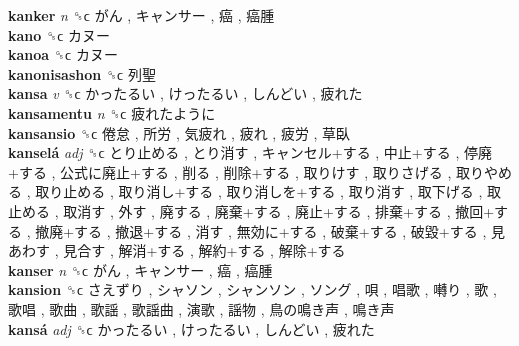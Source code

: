 \textbf{kanker} \emph{n}  ␝ϲ   がん ,  キャンサー ,  癌 ,  癌腫   \\
\textbf{kano} ␝ϲ   カヌー   \\
\textbf{kanoa} ␝ϲ   カヌー   \\
\textbf{kanonisashon} ␝ϲ   列聖   \\
\textbf{kansa} \emph{v}  ␝ϲ   かったるい ,  けったるい ,  しんどい ,  疲れた   \\
\textbf{kansamentu} \emph{n}  ␝ϲ   疲れたように   \\
\textbf{kansansio} ␝ϲ   倦怠 ,  所労 ,  気疲れ ,  疲れ ,  疲労 ,  草臥   \\
\textbf{kanselá} \emph{adj}  ␝ϲ   とり止める ,  とり消す ,  キャンセル+する ,  中止+する ,  停廃+する ,  公式に廃止+する ,  削る ,  削除+する ,  取りけす ,  取りさげる ,  取りやめる ,  取り止める ,  取り消し+する ,  取り消しを+する ,  取り消す ,  取下げる ,  取止める ,  取消す ,  外す ,  廃する ,  廃棄+する ,  廃止+する ,  排棄+する ,  撤回+する ,  撤廃+する ,  撤退+する ,  消す ,  無効に+する ,  破棄+する ,  破毀+する ,  見あわす ,  見合す ,  解消+する ,  解約+する ,  解除+する   \\
\textbf{kanser} \emph{n}  ␝ϲ   がん ,  キャンサー ,  癌 ,  癌腫   \\
\textbf{kansion} ␝ϲ   さえずり ,  シャソン ,  シャンソン ,  ソング ,  唄 ,  唱歌 ,  囀り ,  歌 ,  歌唱 ,  歌曲 ,  歌謡 ,  歌謡曲 ,  演歌 ,  謡物 ,  鳥の鳴き声 ,  鳴き声   \\
\textbf{kansá} \emph{adj}  ␝ϲ   かったるい ,  けったるい ,  しんどい ,  疲れた   \\
